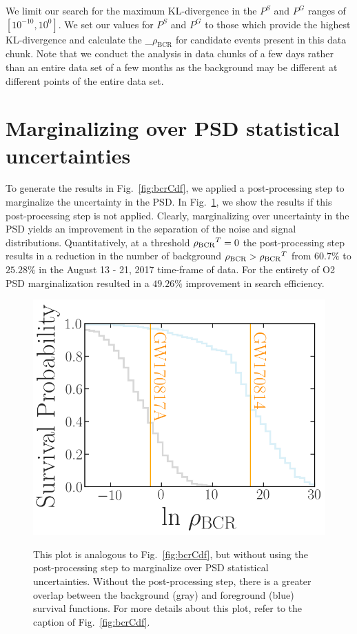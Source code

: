 \documentclass[%
 nofootinbib,
 amsmath,amssymb,
 aps,
 twocolumn,
 superscriptaddress
]{revtex4-2}
\newcommand{\mathcmd}[1]{{\sc \relax\ifmmode#1\else $#1$\fi}\xspace}
\newcommand{\bcr}{\mathcmd{\rho_\text{BCR}}}
\begin{document}
We limit our search for the maximum KL-divergence in the $P^S$ and $P^G$ ranges of $[10^{-10}, 10^0]$. We set our values for $P^S$ and $P^G$ to those which provide the highest KL-divergence and calculate the \bcr for candidate events present in this data chunk. Note that we conduct the analysis in data chunks of a few days rather than an entire data set of a few months as the background may be different at different points of the entire data set.

\section{Marginalizing over PSD statistical uncertainties}\label{sec:psd-marginalization}
To generate the results in Fig.~\ref{fig:bcrCdf}, we applied a post-processing step to marginalize the uncertainty in the PSD. In Fig.~\ref{fig:bcrCdfUnmarginalized}, we show the results if this post-processing step is not applied. Clearly, marginalizing over uncertainty in the PSD yields an improvement in the separation of the noise and signal distributions. Quantitatively, at a threshold $\bcr^T=0$ the post-processing step results in a reduction in the number of background $\bcr > \bcr^T$ from $60.7\%$ to $25.28\%$ in the August 13 - 21, 2017 time-frame of data. For the entirety of O2 PSD marginalization resulted in a $49.26\%$ improvement in search efficiency. 

\begin{figure}[!ht]
{\centering \includegraphics[width=0.85\linewidth]{images/orig_bcr_cdf_smaller_legend.png} }
\caption[BCR distribution example]{This plot is analogous to Fig.~\ref{fig:bcrCdf}, but without using the post-processing step to marginalize over PSD statistical uncertainties. Without the post-processing step, there is a greater overlap between the background (gray) and foreground (blue) survival functions. For more details about this plot, refer to the caption of Fig.~\ref{fig:bcrCdf}.}\label{fig:bcrCdfUnmarginalized}
\end{figure}
\end{document}
